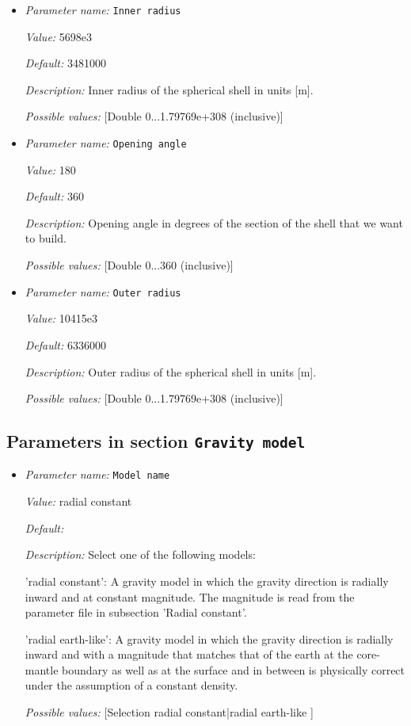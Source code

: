 \begin{itemize}
\item {\it Parameter name:} {\tt Inner radius}


{\it Value:} 5698e3


{\it Default:} 3481000


{\it Description:} Inner radius of the spherical shell in units [m].


{\it Possible values:} [Double 0...1.79769e+308 (inclusive)]
\item {\it Parameter name:} {\tt Opening angle}


{\it Value:} 180


{\it Default:} 360


{\it Description:} Opening angle in degrees of the section of the shell that we want to build.


{\it Possible values:} [Double 0...360 (inclusive)]
\item {\it Parameter name:} {\tt Outer radius}


{\it Value:} 10415e3


{\it Default:} 6336000


{\it Description:} Outer radius of the spherical shell in units [m].


{\it Possible values:} [Double 0...1.79769e+308 (inclusive)]
\end{itemize}

\subsection{Parameters in section \tt Gravity model}

\begin{itemize}
\item {\it Parameter name:} {\tt Model name}


{\it Value:} radial constant


{\it Default:} 


{\it Description:} Select one of the following models:

'radial constant': A gravity model in which the gravity direction is radially inward and at constant magnitude. The magnitude is read from the parameter file in subsection 'Radial constant'.

'radial earth-like': A gravity model in which the gravity direction is radially inward and with a magnitude that matches that of the earth at the core-mantle boundary as well as at the surface and in between is physically correct under the assumption of a constant density.


{\it Possible values:} [Selection radial constant|radial earth-like ]
\end{itemize}



